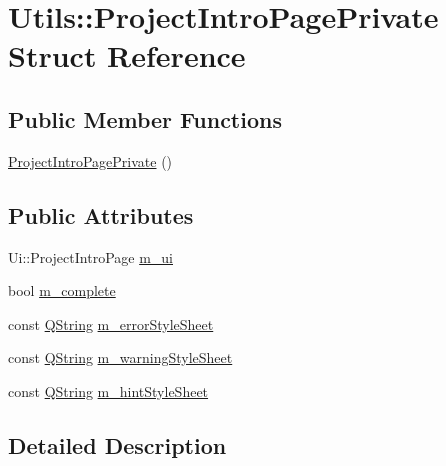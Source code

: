 \hypertarget{struct_utils_1_1_project_intro_page_private}{\section{\-Utils\-:\-:\-Project\-Intro\-Page\-Private \-Struct \-Reference}
\label{struct_utils_1_1_project_intro_page_private}
}
\subsection*{\-Public \-Member \-Functions}
\begin{DoxyCompactItemize}
\item 
\hyperlink{struct_utils_1_1_project_intro_page_private_a192eb9c2bdd9255d53e80d778f5fe78f}{\-Project\-Intro\-Page\-Private} ()
\end{DoxyCompactItemize}
\subsection*{\-Public \-Attributes}
\begin{DoxyCompactItemize}
\item 
\-Ui\-::\-Project\-Intro\-Page \hyperlink{struct_utils_1_1_project_intro_page_private_a8b58b2c9069e4ea0e1dbf49d0588f17e}{m\-\_\-ui}
\item 
bool \hyperlink{struct_utils_1_1_project_intro_page_private_a8d0cb35df948b6dc11517180d9c48efa}{m\-\_\-complete}
\item 
const \hyperlink{group___u_a_v_objects_plugin_gab9d252f49c333c94a72f97ce3105a32d}{\-Q\-String} \hyperlink{struct_utils_1_1_project_intro_page_private_ae97c602c737715475e942302671f5aaf}{m\-\_\-error\-Style\-Sheet}
\item 
const \hyperlink{group___u_a_v_objects_plugin_gab9d252f49c333c94a72f97ce3105a32d}{\-Q\-String} \hyperlink{struct_utils_1_1_project_intro_page_private_a6b536310e9c0d07f8eb1ac3f84f8d9b0}{m\-\_\-warning\-Style\-Sheet}
\item 
const \hyperlink{group___u_a_v_objects_plugin_gab9d252f49c333c94a72f97ce3105a32d}{\-Q\-String} \hyperlink{struct_utils_1_1_project_intro_page_private_a0bff93c252b31403685c055919bd6256}{m\-\_\-hint\-Style\-Sheet}
\end{DoxyCompactItemize}


\subsection{\-Detailed \-Description}


